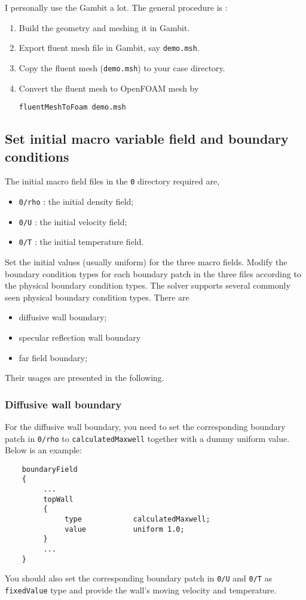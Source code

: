 I personally use the Gambit a lot. The general procedure is :
\begin{enumerate}
\item Build the geometry and meshing it in Gambit.
\item Export fluent mesh file in Gambit, say \verb|demo.msh|.
\item Copy the fluent mesh (\verb|demo.msh|) to your case directory.
\item Convert the fluent mesh to OpenFOAM mesh by
\begin{verbatim}
fluentMeshToFoam demo.msh
\end{verbatim}
\end{enumerate}
\subsection{Set initial macro variable field and boundary conditions}
The initial macro field files in the \verb|0| directory required are,
\begin{itemize}
\item \verb|0/rho| : the initial density field;
\item \verb|0/U|   : the initial velocity field;
\item \verb|0/T|   : the initial temperature field.
\end{itemize}
Set the initial values (usually uniform) for the three macro fields.
Modify the boundary condition types for each boundary patch in the three files according to the physical boundary condition types.
The solver supports several commonly seen physical boundary condition types. There are
\begin{itemize}
\item diffusive wall boundary;
\item specular reflection wall boundary
\item far field boundary;
\end{itemize}
Their usages are presented in the following.
\subsubsection{Diffusive wall boundary}
For the diffusive wall boundary, you need to set the corresponding boundary patch in \verb|0/rho| to \verb|calculatedMaxwell| together with a dummy uniform value.
Below is an example:
\begin{verbatim}
    boundaryField
    {
         ...
         topWall
         {
              type            calculatedMaxwell;
              value           uniform 1.0;
         }
         ...
    }
\end{verbatim}
You should also set the corresponding boundary patch in \verb|0/U| and \verb|0/T| as \verb|fixedValue| type and provide the wall's moving velocity and temperature.

